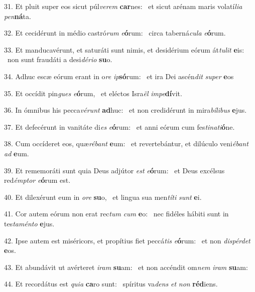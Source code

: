 31. Et pluit super eos sicut púl\textit{ve}\textit{rem} \textbf{car}nes: \ast\  et sicut arénam maris volatí\textit{li}\textit{a} \textit{pen}\textbf{ná}ta.\

32. Et cecidérunt in médio castró\textit{rum} \textit{e}\textbf{ó}rum: \ast\  circa taberná\textit{cu}\textit{la} \textit{e}\textbf{ó}rum.\

33. Et manducavérunt, et saturáti sunt nimis, et desidérium eórum át\textit{tu}\textit{lit} \textbf{e}is: \ast\  non sunt fraudáti a desi\textit{dé}\textit{ri}\textit{o} \textbf{su}o.\

34. Adhuc escæ eórum erant in o\textit{re} \textit{ip}\textbf{só}rum: \ast\  et ira Dei ascén\textit{dit} \textit{su}\textit{per} \textbf{e}os\

35. Et occídit pin\textit{gues} \textit{e}\textbf{ó}rum, \ast\  et eléctos Isra\textit{ël} \textit{im}\textit{pe}\textbf{dí}vit.\

36. In ómnibus his pecca\textit{vé}\textit{runt} \textbf{ad}huc: \ast\  et non credidérunt in mira\textit{bí}\textit{li}\textit{bus} \textbf{e}jus.\

37. Et defecérunt in vanitáte di\textit{es} \textit{e}\textbf{ó}rum: \ast\  et anni eórum cum fes\textit{ti}\textit{na}\textit{ti}\textbf{ó}ne.\

38. Cum occíderet eos, quæ\textit{ré}\textit{bant} \textbf{e}um: \ast\  et revertebántur, et dilúculo veni\textit{é}\textit{bant} \textit{ad} \textbf{e}um.\

39. Et rememoráti sunt quia Deus adjútor \textit{est} \textit{e}\textbf{ó}rum: \ast\  et Deus excélsus red\textit{émp}\textit{tor} \textit{e}\textbf{ó}rum est.\

40. Et dilexérunt eum in \textit{o}\textit{re} \textbf{su}o, \ast\  et lingua sua men\textit{tí}\textit{ti} \textit{sunt} \textbf{e}i.\

41. Cor autem eórum non erat rec\textit{tum} \textit{cum} \textbf{e}o: \ast\  nec fidéles hábiti sunt in tes\textit{ta}\textit{mén}\textit{to} \textbf{e}jus.\

42. Ipse autem est miséricors, et propítius fiet peccá\textit{tis} \textit{e}\textbf{ó}rum: \ast\  et non \textit{dis}\textit{pér}\textit{det} \textbf{e}os.\

43. Et abundávit ut avérteret \textit{i}\textit{ram} \textbf{su}am: \ast\  et non accéndit om\textit{nem} \textit{i}\textit{ram} \textbf{su}am:\

44. Et recordátus est \textit{qui}\textit{a} \textbf{ca}ro sunt: \ast\  spíritus va\textit{dens} \textit{et} \textit{non} \textbf{réd}iens.\

